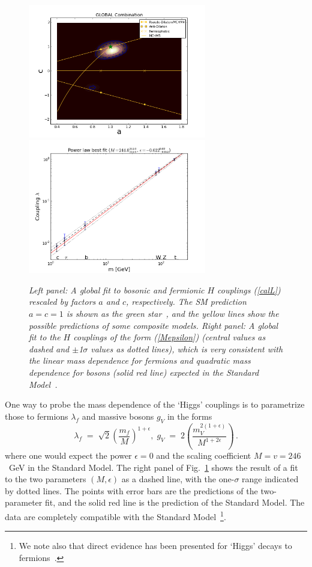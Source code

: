 \documentclass[12pt]{article}
\numberwithin{equation}{section}
\begin{document}
\begin{figure}[htb]
\centering
\includegraphics[height=2.3in]{GLOBAL_Combination.png}
\includegraphics[height=2.3in]{Mass_dependence.png}
\caption{\it Left panel: A global fit to bosonic and fermionic $H$ couplings (\protect\ref{calL}) rescaled by factors $a$ and $c$, respectively.
The SM prediction $a = c = 1$ is shown as the green star~\protect\cite{EY3}, and the yellow lines
show the possible predictions of some composite models. Right panel: A global fit to the $H$ couplings of the form (\protect\ref{Mepsilon})
(central values as dashed and
$\pm$1$\sigma$ values as dotted lines), which is very consistent
with the linear mass dependence for fermions and quadratic mass dependence for bosons (solid
red line) expected in the Standard Model~\protect\cite{EY3}.}
\label{fig:EY}
\end{figure}

One way to probe the mass dependence of the `Higgs' couplings is to parametrize those to fermions $\lambda_f$
and massive bosons $g_V$ in the forms~\cite{EY3}
 \begin{equation}
\lambda_f \; = \; \sqrt{2} \left(\frac{m_f}{M}\right)^{1 + \epsilon}, \; g_V \; = \; 2 \left(\frac{m_V^{2(1 + \epsilon)}}{M^{1 + 2\epsilon}}\right) \, .
\label{Mepsilon}
\end{equation}
where one would expect the power $\epsilon = 0$ and the scaling
coefficient $M = v = 246$~GeV in the Standard Model. The right panel of Fig.~\ref{fig:EY} shows the result of a fit
to the two parameters $(M, \epsilon)$ as a dashed line,
with the one-$\sigma$ range indicated by dotted lines. The points with error bars are the predictions of
the two-parameter fit, and the solid red line is the
prediction of the Standard Model. The data are completely compatible with the Standard
Model~\footnote{We note also that direct evidence has been presented for `Higgs' decays to fermions~\cite{CMSf}.}.
\end{document}
